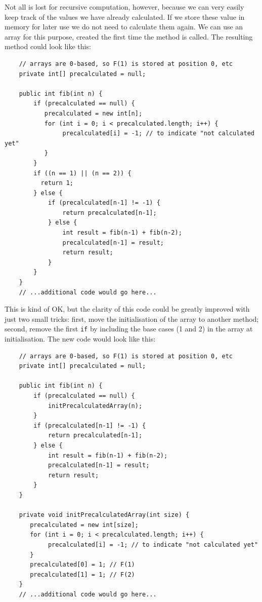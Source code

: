 Not all is lost for recursive computation, however, because we can
very easily keep track of the values we have already calculated. If we
store these value in memory for later use we do not need to calculate
them again. We can use an array for this purpose, created the first
time the method is called. The resulting method could look like this: 

\begin{verbatim}
    // arrays are 0-based, so F(1) is stored at position 0, etc
    private int[] precalculated = null;

    public int fib(int n) {
        if (precalculated == null) {
           precalculated = new int[n];
           for (int i = 0; i < precalculated.length; i++) {
                precalculated[i] = -1; // to indicate "not calculated yet"
           }
        }
        if ((n == 1) || (n == 2)) {
          return 1; 
        } else {
            if (precalculated[n-1] != -1) {
                return precalculated[n-1];
            } else {
                int result = fib(n-1) + fib(n-2);
                precalculated[n-1] = result;
                return result;
            }
        }
    }
    // ...additional code would go here...
\end{verbatim}

This is kind of OK, but the clarity of this code could be greatly
improved with just two small tricks: first, move the initialisation
of the array to another method; second, remove the first \verb+if+ by
including the base cases (1 and 2) in the array at initialisation. The
new code would look like this: 

\begin{verbatim}
    // arrays are 0-based, so F(1) is stored at position 0, etc
    private int[] precalculated = null;

    public int fib(int n) {
        if (precalculated == null) {
            initPrecalculatedArray(n);
        }
        if (precalculated[n-1] != -1) {
            return precalculated[n-1];
        } else {
            int result = fib(n-1) + fib(n-2);
            precalculated[n-1] = result;
            return result;
        }
    }

    private void initPrecalculatedArray(int size) {
       precalculated = new int[size];
       for (int i = 0; i < precalculated.length; i++) {
            precalculated[i] = -1; // to indicate "not calculated yet"
       }
       precalculated[0] = 1; // F(1)
       precalculated[1] = 1; // F(2)
    }
    // ...additional code would go here...
\end{verbatim}


